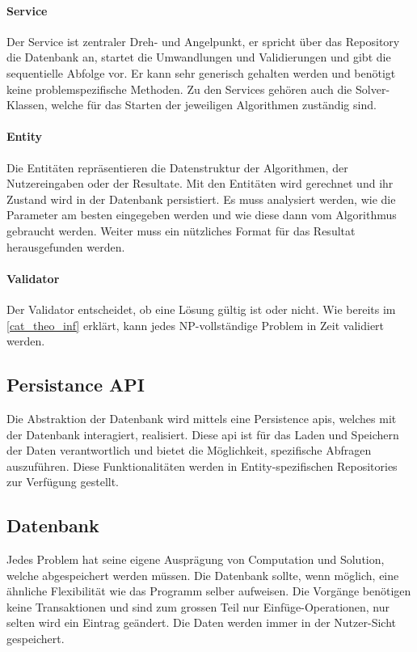 \paragraph{Service}
Der Service ist zentraler Dreh- und Angelpunkt, er spricht über das Repository die Datenbank an, startet die Umwandlungen und Validierungen und gibt die sequentielle Abfolge vor. Er kann 
sehr generisch gehalten werden und benötigt keine problemspezifische Methoden. Zu den Services gehören auch die Solver-Klassen, welche für das Starten der jeweiligen Algorithmen zuständig 
sind.
\paragraph{Entity}
Die Entitäten repräsentieren die Datenstruktur der Algorithmen, der Nutzereingaben oder der Resultate. Mit den Entitäten wird gerechnet und ihr Zustand wird in der Datenbank persistiert. 
Es muss analysiert werden, wie die Parameter am besten eingegeben werden und wie diese dann vom Algorithmus gebraucht werden. Weiter muss ein nützliches Format für das Resultat 
herausgefunden werden.
\paragraph{Validator}
Der Validator entscheidet, ob eine Lösung gültig ist oder nicht. Wie bereits im \autoref{cat_theo_inf} erklärt, kann jedes NP-vollständige Problem in  Zeit validiert werden.

\subsection{Persistance API}
Die Abstraktion der Datenbank wird mittels eine Persistence \glspl{api}, welches mit der Datenbank interagiert, realisiert. Diese \gls{api} ist für das Laden und Speichern der Daten 
verantwortlich und bietet die Möglichkeit, spezifische Abfragen auszuführen. Diese Funktionalitäten werden in Entity-spezifischen Repositories zur Verfügung gestellt.

\subsection{Datenbank}
Jedes Problem hat seine eigene Ausprägung von Computation und Solution, welche abgespeichert werden müssen. Die Datenbank sollte, wenn möglich, eine ähnliche Flexibilität wie 
das Programm selber aufweisen. Die Vorgänge benötigen keine Transaktionen und sind zum grossen Teil nur Einfüge-Operationen, nur selten wird ein Eintrag geändert. Die Daten werden 
immer in der Nutzer-Sicht gespeichert.

